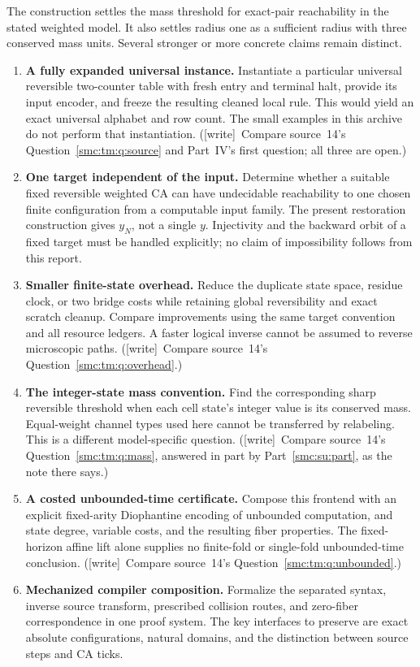\documentclass[11pt,letterpaper]{article}
\numberwithin{equation}{section}
\theoremstyle{definition}
\theoremstyle{remark}
\newcommand{\wtag}{\textup{[write]}}
\begin{document}
The construction settles the mass threshold for exact-pair reachability in the stated weighted model. It also settles radius one as a sufficient radius with three conserved mass units. Several stronger or more concrete claims remain distinct.
\begin{enumerate}
\item\label{smc:ct:q:universal} \textbf{A fully expanded universal instance.} Instantiate a particular universal reversible two-counter table with fresh entry and terminal halt, provide its input encoder, and freeze the resulting cleaned local rule. This would yield an exact universal alphabet and row count. The small examples in this archive do not perform that instantiation. (\wtag\ Compare source~14's Question~\ref{smc:tm:q:source} and Part~IV's first question; all three are open.)
\item\label{smc:ct:q:fixedtarget} \textbf{One target independent of the input.} Determine whether a suitable fixed reversible weighted CA can have undecidable reachability to one chosen finite configuration from a computable input family. The present restoration construction gives $y_N$, not a single $y$. Injectivity and the backward orbit of a fixed target must be handled explicitly; no claim of impossibility follows from this report.
\item\label{smc:ct:q:overhead} \textbf{Smaller finite-state overhead.} Reduce the duplicate state space, residue clock, or two bridge costs while retaining global reversibility and exact scratch cleanup. Compare improvements using the same target convention and all resource ledgers. A faster logical inverse cannot be assumed to reverse microscopic paths. (\wtag\ Compare source~14's Question~\ref{smc:tm:q:overhead}.)
\item\label{smc:ct:q:mass} \textbf{The integer-state mass convention.} Find the corresponding sharp reversible threshold when each cell state's integer value is its conserved mass. Equal-weight channel types used here cannot be transferred by relabeling. This is a different model-specific question. (\wtag\ Compare source~14's Question~\ref{smc:tm:q:mass}, answered in part by Part~\ref{smc:su:part}, as the note there says.)
\item\label{smc:ct:q:unbounded} \textbf{A costed unbounded-time certificate.} Compose this frontend with an explicit fixed-arity Diophantine encoding of unbounded computation, and state degree, variable costs, and the resulting fiber properties. The fixed-horizon affine lift alone supplies no finite-fold or single-fold unbounded-time conclusion. (\wtag\ Compare source~14's Question~\ref{smc:tm:q:unbounded}.)
\item\label{smc:ct:q:mechanized} \textbf{Mechanized compiler composition.} Formalize the separated syntax, inverse source transform, prescribed collision routes, and zero-fiber correspondence in one proof system. The key interfaces to preserve are exact absolute configurations, natural domains, and the distinction between source steps and CA ticks.
\end{enumerate}
\end{document}
